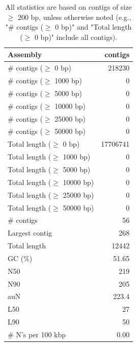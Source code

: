 \documentclass[12pt,a4paper]{article}
\begin{document}
\begin{table}[ht]
\begin{center}
\caption{All statistics are based on contigs of size $\geq$ 200 bp, unless otherwise noted (e.g., "\# contigs ($\geq$ 0 bp)" and "Total length ($\geq$ 0 bp)" include all contigs).}
\begin{tabular}{|l*{1}{|r}|}
\hline
Assembly & contigs \\ \hline
\# contigs ($\geq$ 0 bp) & 218230 \\ \hline
\# contigs ($\geq$ 1000 bp) & 0 \\ \hline
\# contigs ($\geq$ 5000 bp) & 0 \\ \hline
\# contigs ($\geq$ 10000 bp) & 0 \\ \hline
\# contigs ($\geq$ 25000 bp) & 0 \\ \hline
\# contigs ($\geq$ 50000 bp) & 0 \\ \hline
Total length ($\geq$ 0 bp) & 17706741 \\ \hline
Total length ($\geq$ 1000 bp) & 0 \\ \hline
Total length ($\geq$ 5000 bp) & 0 \\ \hline
Total length ($\geq$ 10000 bp) & 0 \\ \hline
Total length ($\geq$ 25000 bp) & 0 \\ \hline
Total length ($\geq$ 50000 bp) & 0 \\ \hline
\# contigs & 56 \\ \hline
Largest contig & 268 \\ \hline
Total length & 12442 \\ \hline
GC (\%) & 51.65 \\ \hline
N50 & 219 \\ \hline
N90 & 205 \\ \hline
auN & 223.4 \\ \hline
L50 & 27 \\ \hline
L90 & 50 \\ \hline
\# N's per 100 kbp & 0.00 \\ \hline
\end{tabular}
\end{center}
\end{table}
\end{document}
